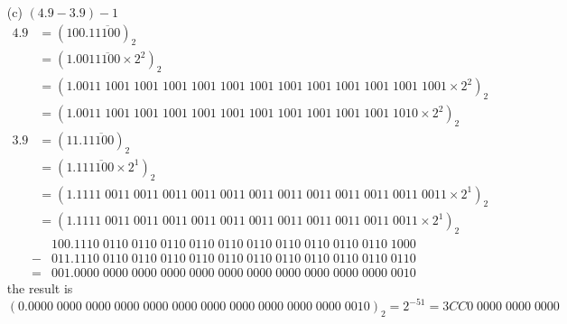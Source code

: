 \documentclass[UTF8]{ctexart}
\begin{document}
\begin{enumerate}
\begin{itemize}
\item[(c)] $(4.9 - 3.9) - 1$
\begin{align*}
4.9 &= (100.1\overline{1100})_2 \\
&= (1.001\overline{1100} \times 2^2)_2 \\
&= (1.0011\;1001\;1001\;1001\;1001\;1001\;1001\;1001\;1001\;1001\;1001\;1001\;1001\times 2^2)_2 \\
&= (1.0011\;1001\;1001\;1001\;1001\;1001\;1001\;1001\;1001\;1001\;1001\;1010 \times 2^2)_2
\end{align*}
\begin{align*}
3.9 &= (11.1\overline{1100})_2  \\
&= (1.11\overline{1100} \times 2^1)_2 \\
&= (1.1111\;0011\;0011\;0011\;0011\;0011\;0011\;0011\;0011\;0011\;0011\;0011\;0011 \times 2^1)_2 \\
&= (1.1111\;0011\;0011\;0011\;0011\;0011\;0011\;0011\;0011\;0011\;0011\;0011 \times 2^1)_2
\end{align*}
\begin{align*}
 &100.1110\;0110\;0110\;0110\;0110\;0110\;0110\;0110\;0110\;0110\;0110\;1000 \\
-&011.1110\;0110\;0110\;0110\;0110\;0110\;0110\;0110\;0110\;0110\;0110\;0110 \\
\hline
=&001.0000\;0000\;0000\;0000\;0000\;0000\;0000\;0000\;0000\;0000\;0000\;0010
\end{align*}
the result is $(0.0000\;0000\;0000\;0000\;0000\;0000\;0000\;0000\;0000\;0000\;0000\;0010)_2 = 2^{-51} = 3CC0\;0000\;0000\;0000$

\end{itemize}


\end{enumerate}
\end{document}
